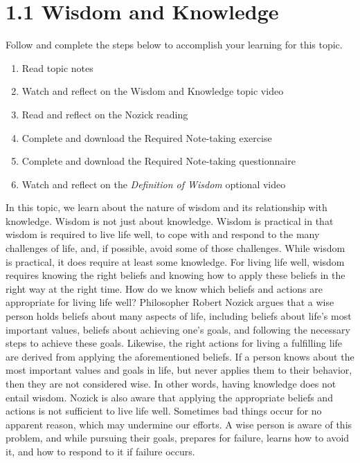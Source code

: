 \documentclass[
]{book}
\providecommand{\tightlist}{%
  \setlength{\itemsep}{0pt}\setlength{\parskip}{0pt}}
\begin{document}
\hypertarget{wisdom-and-knowledge}{%
\section*{1.1 Wisdom and Knowledge}\label{wisdom-and-knowledge}}

Follow and complete the steps below to accomplish your learning for this topic.

\begin{enumerate}
\def\labelenumi{\arabic{enumi}.}
\tightlist
\item
  Read topic notes
\item
  Watch and reflect on the Wisdom and Knowledge topic video
\item
  Read and reflect on the Nozick reading
\item
  Complete and download the Required Note-taking exercise
\item
  Complete and download the Required Note-taking questionnaire
\item
  Watch and reflect on the \emph{Definition of Wisdom} optional video
\end{enumerate}

In this topic, we learn about the nature of wisdom and its relationship with knowledge. Wisdom is not just about knowledge. Wisdom is practical in that wisdom is required to live life well, to cope with and respond to the many challenges of life, and, if possible, avoid some of those challenges. While wisdom is practical, it does require at least some knowledge. For living life well, wisdom requires knowing the right beliefs and knowing how to apply these beliefs in the right way at the right time. How do we know which beliefs and actions are appropriate for living life well? Philosopher Robert Nozick argues that a wise person holds beliefs about many aspects of life, including beliefs about life's most important values, beliefs about achieving one's goals, and following the necessary steps to achieve these goals. Likewise, the right actions for living a fulfilling life are derived from applying the aforementioned beliefs. If a person knows about the most important values and goals in life, but never applies them to their behavior, then they are not considered wise. In other words, having knowledge does not entail wisdom. Nozick is also aware that applying the appropriate beliefs and actions is not sufficient to live life well. Sometimes bad things occur for no apparent reason, which may undermine our efforts. A wise person is aware of this problem, and while pursuing their goals, prepares for failure, learns how to avoid it, and how to respond to it if failure occurs.
\end{document}
